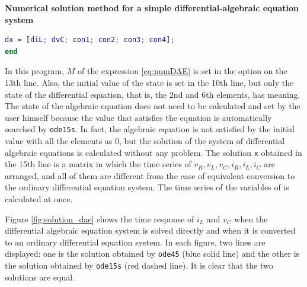\documentclass[graybox, envcountchap]{svmult}
\begin{document}
\begin{example}{\textbf{Numerical solution method for a simple differential-algebraic
equation system}}
\begin{lstlisting}[language=Matlab, caption=main\_RLC\_dae.m, label={program:DAE1}]
  dx = [diL; dvC; con1; con2; con3; con4];
end
\end{lstlisting}

In this program, $M$ of the expression \ref{eq:numDAE} is set in the option on
the 13th line. Also, the initial value of the state is set in the 10th line,
but only the state of the differential equation, that is, the 2nd and 6th
elements, has meaning. The state of the algebraic equation does not need to be
calculated and set by the user himself because the value that satisfies the
equation is automatically searched by \verb|ode15s|. In fact, the algebraic
equation is not satisfied by the initial value with all the elements as $0$, but
the solution of the system of differential algebraic equations is calculated
without any problem. The solution \verb|x| obtained in the 15th line is a
matrix in which the time series of $v_R, v_L, v_C, i_R, i_L, i_C$ are arranged,
and all of them are different from the case of equivalent conversion to the
ordinary differential equation system. The time series of the variables of is
calculated at once.

Figure \ref{fig:solution_dae} shows the time response of $i_L$ and $v_C$ when
the differential algebraic equation system is solved directly and when it is
converted to an ordinary differential equation system.  In each figure, two
lines are displayed: one is the solution obtained by \verb|ode45| (blue solid
line) and the other is the solution obtained by \verb|ode15s| (red dashed line).
It is clear that the two solutions are equal.


\end{example}
\end{document}
